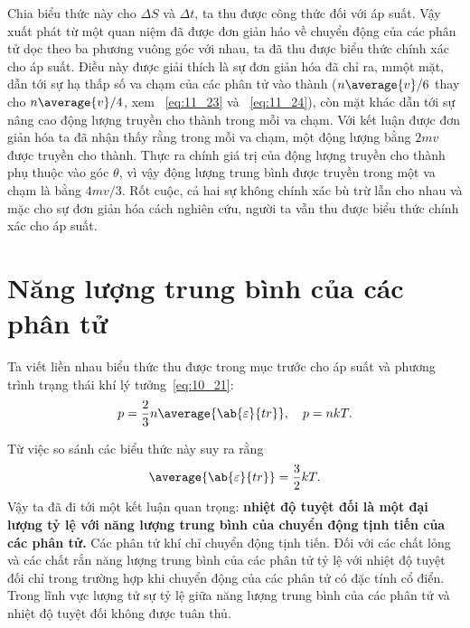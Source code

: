 \noindent
Chia biểu thức này cho $\Delta S$ và $\Delta t$, ta thu được công thức  đối với áp suất. Vậy xuất phát từ một quan niệm đã được đơn giản háo về chuyển động của các phân tử dọc theo ba phương vuông góc với nhau, ta đã thu được biểu thức chính xác cho áp suất. Điều này được giải thích là sự đơn giản hóa đã chỉ ra, mmột mặt, dẫn tới sự hạ thấp số va chạm của các phân tử vào thành ($n\average{v}/6$ thay cho $n\average{v}/4$, xem ~\eqref{eq:11_23} và ~\eqref{eq:11_24}), còn mặt khác dẫn tới sự nâng cao động lượng truyền cho thành trong mỗi va chạm. Với kết luận được đơn giản hóa ta đã nhận thấy rằng trong mỗi va chạm, một động lượng bằng $2mv$ được truyền cho thành. Thực ra chính giá trị của động lượng truyền cho thành phụ thuộc vào góc $\theta$, vì vậy động lượng trung bình được truyền trong một va chạm là bằng $4mv/3$. Rốt cuộc, cả hai sự không chính xác bù trừ lẫn cho nhau và mặc cho sự đơn giản hóa cách nghiên cứu, người ta vẫn thu được biểu thức chính xác cho áp suất.

\section{Năng lượng trung bình của các phân tử}\label{sec:11_5}

Ta viết liền nhau biểu thức  thu được trong mục trước cho áp suất và phương trình trạng thái khí lý tưởng~\eqref{eq:10_21}:
\begin{equation*}
	p = \frac{2}{3}n\average{\ab{\varepsilon}{tr}},\quad p = nkT.
\end{equation*}

\noindent
Từ việc so sánh các biểu thức này suy ra rằng
\begin{equation}\label{eq:11_30}
	\average{\ab{\varepsilon}{tr}} = \frac{3}{2}kT.
\end{equation}
\noindent
Vậy ta đã đi tới một kết luận quan trọng: \textbf{nhiệt độ tuyệt đối là một đại lượng tỷ lệ với năng lượng trung bình của chuyển động tịnh tiến của các phân tử.} Các phân tử khí chỉ chuyển động tịnh tiến. Đối với các chất lỏng và các chất rắn năng lượng trung bình của các phân tử tỷ lệ với nhiệt độ tuyệt đối chỉ trong trường hợp khi chuyển động của các phân tử có đặc tính cổ điển. Trong lĩnh vực lượng tử sự tỷ lệ giữa năng lượng trung bình của các phân tử và nhiệt độ tuyệt đối không được tuân thủ.

